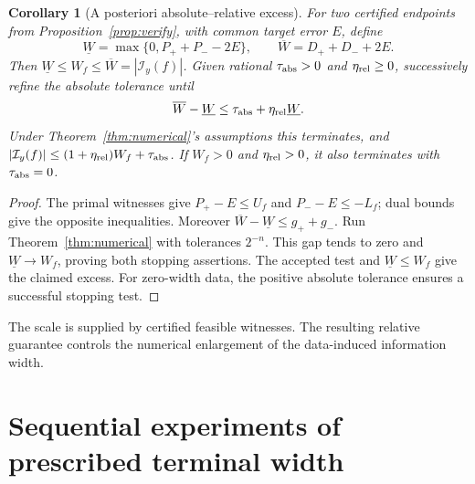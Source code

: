 \documentclass[10pt]{amsart}
\newtheorem{corollary}[theorem]{Corollary}
\theoremstyle{definition}
\theoremstyle{remark}
\begin{document}
\begin{corollary}[A posteriori absolute--relative excess]\label{cor:relative}
For two certified endpoints from Proposition~\ref{prop:verify}, with common target error $E$, define
\[
 \underline W=\max\{0,P_++P_- -2E\},\qquad
 \overline W=D_++D_-+2E.
\]
Then $\underline W\le W_f\le\overline W=|\mathcal I_y(f)|$. Given rational $\tau_{\rm abs}>0$ and $\eta_{\rm rel}\ge0$, successively refine the absolute tolerance until
\begin{equation}\label{eq:relative}
 \overline W-\underline W\le\tau_{\rm abs}+\eta_{\rm rel}\underline W.
\end{equation}
Under Theorem~\ref{thm:numerical}'s assumptions this terminates, and
$|\mathcal I_y(f)|\le(1+\eta_{\rm rel})W_f+\tau_{\rm abs}$.
If $W_f>0$ and $\eta_{\rm rel}>0$, it also terminates with $\tau_{\rm abs}=0$.
\end{corollary}
\begin{proof}
The primal witnesses give $P_+-E\le U_f$ and $P_--E\le -L_f$; dual bounds give the opposite inequalities. Moreover $\overline W-\underline W\le g_++g_-$. Run Theorem~\ref{thm:numerical} with tolerances $2^{-n}$. This gap tends to zero and $\underline W\to W_f$, proving both stopping assertions. The accepted test and $\underline W\le W_f$ give the claimed excess. For zero-width data, the positive absolute tolerance ensures a successful stopping test.
\end{proof}
The scale is supplied by certified feasible witnesses. The resulting relative guarantee controls the numerical enlargement of the data-induced information width.

\section{Sequential experiments of prescribed terminal width}\label{sec:sequential}
\end{document}
